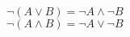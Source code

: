 \documentclass[preview]{standalone}
\begin{document}
\begin{center}
${\neg (A\vee B)=\neg A\wedge \neg B}$ \\ ${\neg (A\wedge B)=\neg A\vee \neg B}$
\end{center}
\end{document}
